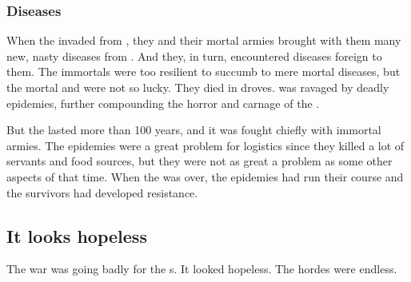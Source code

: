 




\subsubsection{Diseases}
When the \resphain invaded from \Nyx, they and their mortal armies brought with them many new, nasty diseases from \Nyx.
And they, in turn, encountered \Tembraean diseases foreign to them.
The immortals were too resilient to succumb to mere mortal diseases, but the mortal \Tembraeans and \Nyxians were not so lucky.
They died in droves.
\Tembrae was ravaged by deadly epidemies, further compounding the horror and carnage of the \secondbanewar.

But the \secondbanewar lasted more than 100 years, and it was fought chiefly with immortal armies.
The epidemies were a great problem for logistics since they killed a lot of servants and food sources, but they were not as great a problem as some other aspects of that time.
When the \secondbanewar was over, the epidemies had run their course and the survivors had developed resistance.









\subsection{It looks hopeless}
The war was going badly for the \Miithian s. 
It looked hopeless. 
The \bane{} hordes were endless. 

